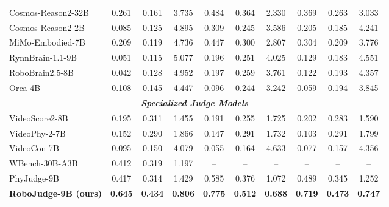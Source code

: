 \begin{table}[t]
\begin{tabular}{@{}l ccc ccc cc c@{}}
Cosmos-Reason2-32B~\citep{nvidia2025cosmosreason2}
& 0.261 & 0.161 & 3.735
& 0.484 & 0.364 & 2.330
& 0.369 & 0.263 & 3.033 \\

Cosmos-Reason2-2B~\citep{nvidia2025cosmosreason2}
& 0.085 & 0.125 & 4.895
& 0.309 & 0.245 & 3.586
& 0.205 & 0.185 & 4.241 \\

MiMo-Embodied-7B~\citep{hao2025mimoembodied}
& 0.209 & 0.119 & 4.736
& 0.447 & 0.300 & 2.807
& 0.304 & 0.209 & 3.776 \\

RynnBrain-1.1-9B~\citep{damo2026rynnbrain11}
& 0.051 & 0.115 & 5.077
& 0.196 & 0.251 & 4.025
& 0.129 & 0.183 & 4.551 \\

RoboBrain2.5-8B~\citep{tan2026robobrain25}
& 0.042 & 0.128 & 4.952
& 0.197 & 0.259 & 3.761
& 0.122 & 0.193 & 4.357 \\

Orca-4B~\citep{orca2026}
& 0.108 & 0.145 & 4.447
& 0.096 & 0.244 & 3.242
& 0.059 & 0.194 & 3.845 \\

\midrule
\multicolumn{10}{c}{\textit{\textbf{Specialized Judge Models}}}\\
\midrule
VideoScore2-8B~\citep{videoscore2}
& 0.195 & 0.311 & 1.455
& 0.191 & 0.255 & 1.725
& 0.202 & 0.283 & 1.590 \\

VideoPhy-2-7B~\citep{videophy2}
& 0.152 & 0.290 & 1.866
& 0.147 & 0.291 & 1.732
& 0.103 & 0.291 & 1.799 \\

VideoCon-7B~\citep{bansal2024videocon}
& 0.095 & 0.150 & 4.079
& 0.055 & 0.164 & 4.633
& 0.077 & 0.157 & 4.356 \\

WBench-30B-A3B~\citep{ying2026wbench}
& 0.412 & 0.319 & 1.197
& -- & -- & --
& -- & -- & -- \\

PhyJudge-9B~\citep{lin2026phyground}
& 0.417 & 0.314 & 1.429
& 0.585 & 0.376 & 1.072
& 0.489 & 0.345 & 1.252 \\

\textbf{RoboJudge-9B (ours)}
& \textbf{0.645} & \textbf{0.434} & \textbf{0.806}
& \textbf{0.775} & \textbf{0.512} & \textbf{0.688}
& \textbf{0.719} & \textbf{0.473} & \textbf{0.747} \\

\hline
\end{tabular}
\end{table}

